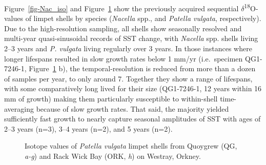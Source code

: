 \documentclass[
  authoryear,
  preprint,
  3p]{elsarticle}
\begin{document}
Figure~\ref{fig-Nac_iso} and Figure~\ref{fig-Pat_iso} show the
previously acquired sequential \(\delta\)\textsuperscript{18}O-values of
limpet shells by species (\emph{Nacella} spp., and \emph{Patella
vulgata}, respectively). Due to the high-resolution sampling, all shells
show seasonally resolved and multi-year quasi-sinusoidal records of SST
change, with \emph{Nacella} spp. shells living 2--3 years and \emph{P.
vulgata} living regularly over 3 years. In those instances where longer
lifespans resulted in slow growth rates below 1 mm/yr (i.e.~specimen
QG1-7246-1, Figure~\ref{fig-Pat_iso} b), the temporal-resolution is
reduced from more than a dozen of samples per year, to only around 7.
Together they show a range of lifespans, with some comparatively long
lived for their size (QG1-7246-1, 12 years within 16 mm of growth)
making them particularly susceptible to within-shell time-averaging
because of slow growth rates. That said, the majority yielded
sufficiently fast growth to nearly capture seasonal amplitudes of SST
with ages of 2--3 years (n=3), 3--4 years (n=2), and 5 years (n=2).

\begin{figure}[H]


\caption{\label{fig-Pat_iso}Isotope values of \emph{Patella vulgata}
limpet shells from Quoygrew (QG, \emph{a-g}) and Rack Wick Bay (ORK,
\emph{h}) on Westray, Orkney.}

\end{figure}%
\end{document}
